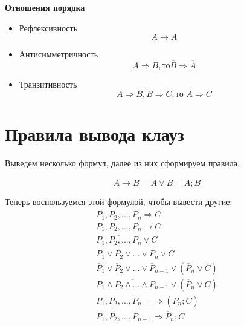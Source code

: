 \textbf{Отношения порядка}
\begin{itemize}
    \item Рефлексивность
    \begin{equation}
        A \to A
    \end{equation}

    \item Антисимметричность
    \begin{equation}
        A \Rightarrow B, то \overline B \Rightarrow \overline A
    \end{equation}

    \item Транзитивность
    \begin{equation}
        A \Rightarrow B, B \Rightarrow C, \text{то } A \Rightarrow C
    \end{equation}
\end{itemize}

\section{Правила вывода клауз}
Выведем несколько формул, далее из них сформируем правила.

\begin{equation}\label{eq_clause}
    A \to B = \overline A \lor B = \overline A; B
\end{equation}

Теперь воспользуемся этой формулой, чтобы вывести другие:
\begin{gather}\label{eq_clauses}
    \begin{aligned}
        P_1, P_2, ..., P_n \Rightarrow C \\
        P_1, P_2, ..., P_n \to C \\
        \overline {P_1, P_2, ..., P_n} \lor C \\
        \overline P_1 \lor \overline P_2 \lor ... \lor \overline P_n \lor C \\
        \overline P_1 \lor \overline P_2 \lor ... \lor \overline P_{n-1} \lor (\overline P_n \lor C) \\
        \overline {P_1 \land P_2 \land ... \land P_{n-1}} \lor (\overline P_n \lor C) \\
        P_1, P_2, ..., P_{n-1} \Rightarrow (\overline P_n ; C) \\
        P_1, P_2, ..., P_{n-1} \Rightarrow \overline P_n; C
    \end{aligned}
\end{gather}

